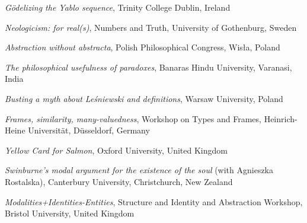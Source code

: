 \documentclass[10pt, a4paper]{article}
\newcommand{\years}[1]{\marginnote{\normalsize #1}}
\begin{document}
\vspace{0.5mm}




\years{2012} \emph{G{\"o}delizing the Yablo sequence},  Trinity College Dublin, Ireland


\vspace{0.5mm}



\emph{Neologicism: for real(s)}, Numbers and Truth, University of Gothenburg, Sweden



\vspace{0.5mm}

 \emph{Abstraction without abstracta}, Polish Philosophical Congress, Wis{\l}a, Poland


\vspace{0.5mm}


\emph{The philosophical usefulness of paradoxes},  Banaras Hindu University, Varanasi, India



\vspace{0.5mm}

 \emph{Busting a myth about Le\' sniewski and definitions},  Warsaw University, Poland


\vspace{0.5mm}





\years{2010} \emph{Frames, similarity, many-valuedness}, Workshop on Types and Frames,    Heinrich-Heine Universit\"at, D\"usseldorf, Germany



\vspace{0.5mm}


\emph{Yellow Card for Salmon},   Oxford University, United Kingdom


\vspace{0.5mm}


  \emph{Swinburne's modal argument for the existence of the soul} (with Agnieszka Rostalska),  Canterbury University, Christchurch, New Zealand



\vspace{0.5mm}



\years{2009} \emph{Modalities+Identities-Entities}, Structure and Identity and Abstraction Workshop,      Bristol University, United Kingdom



\vspace{0.5mm}
\end{document}
